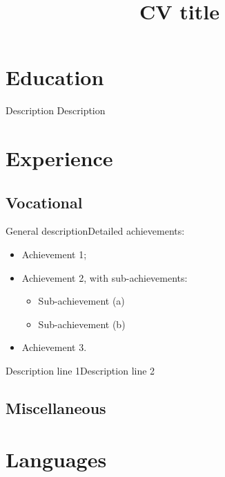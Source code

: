 \documentclass[12pt,a4paper,sans]{moderncv}
\title{CV title}
\begin{document}
\makecvtitle
\section{Education}
%
  {Description}
%
  {Description}
\section{Experience}
\subsection{Vocational}
%
  {General description\newline{}Detailed achievements:%
\begin{itemize}%
  \item Achievement 1;
  \item Achievement 2, with sub-achievements:
    \begin{itemize}%
    \item Sub-achievement (a)
    \item Sub-achievement (b)
  \end{itemize}
\item Achievement 3.
\end{itemize}}
  {Description line 1\newline{}Description line 2}
\subsection{Miscellaneous}
\section{Languages}
\end{document}
